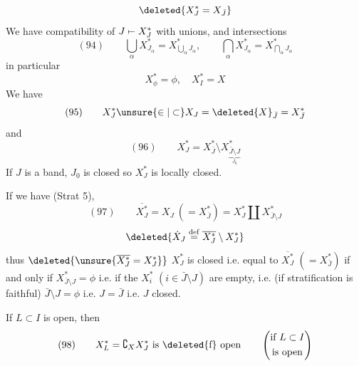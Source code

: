 
\[
\deleted{X_J^*=X_{\bar J}}
\]
We have compatibility of $J\mathrel{\mapstochar\relbar}X_J^*$ with unions, and intersections
\[
(94)\qquad\bigcup_\alpha X_{J_\alpha}^*=X_{\bigcup_\alpha J_\alpha}^*,\qquad\bigcap_\alpha X_{J_\alpha}^*=X_{\bigcap_\alpha J_\alpha}^*
\]
in particular
\[
X_\phi^*=\phi,\quad X_I^*=X
\]
We have
\[
(95)\qquad X_J^*\unsure{\in|\subset}X_J=\deleted{X}_{\bar J}=X_{\bar J}^*
\]
and
\[
(96)\qquad X_J^*=X_{\bar J}^*\setminus X_{\underbrace{\bar J\setminus J}_{J_0}}^*
\]
If $J$ is a band, $J_0$ is closed so $X_J^*$ is locally closed.

If we have (Strat 5), 
\[
(97)\qquad\overline{X_J^*}=X_J\ (=X_{\bar J}^*)=X_J^*\amalg X_{\bar J\setminus J}^*
\]
\[
\deleted{\dot X_J\overset{\mathrm{def}}=\overline{X_J^*}\setminus X_J^*}
\]
thus $\deleted{\unsure{\overline{X_J^*}=X_J^*}}$ $X_J^*$ is closed i.e. equal to $\overline{X_J^*}$ $(=X_{\bar J}^*)$ if and only if $X_{\bar J\setminus J}^*=\phi$ i.e. if the $X_i^*$ $(i\in\bar J\setminus J)$ are empty, i.e. (if stratification is faithful)  $\bar J\setminus J=\phi$ i.e. $J=\bar J$ i.e. $J$ closed.

If  $L\subset I$ is open,  then
\[
(98)\qquad X_L^*=\complement_X X_J^*\text{ is }\text{\deleted{f}}\text{ open}\qquad\left(\begin{gathered}\text{if }L\subset I\\\text{is open}\end{gathered}\right)
\]
